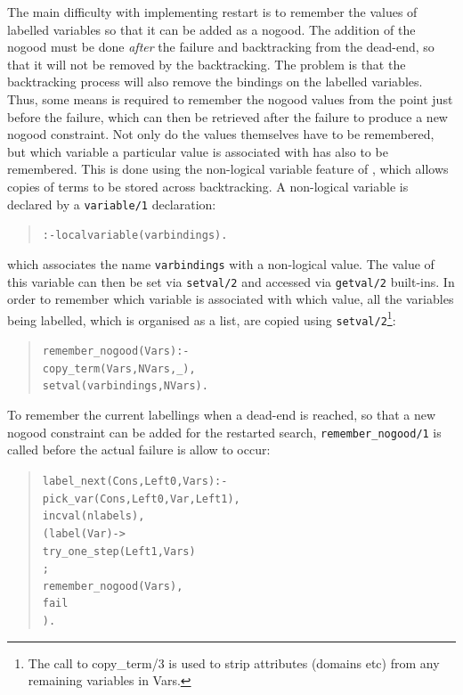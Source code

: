 The main difficulty with implementing restart is to remember the values of 
labelled variables so that it can be added as a nogood. The addition of the
nogood must be done {\it after\/} the failure and backtracking from the
dead-end, so that it will not be removed by the backtracking. The problem is
that the backtracking process will also remove the bindings on the labelled
variables. Thus, some means is required to remember the nogood values from
the point just before the failure, which can then be retrieved after the
failure to produce a new nogood constraint. Not only do the values
themselves have to be remembered, but which variable a particular value is
associated with has also to be remembered. This is done using the
non-logical variable feature of {\eclipse}, which allows copies of
terms to be stored across backtracking. A non-logical variable is
declared by a \verb'variable/1' declaration:

\begin{quote}\begin{alltt}
:- local variable(varbindings).
\end{alltt}\end{quote}

\noindent
which associates the name \verb'varbindings' with a non-logical value. The
value of this variable can then be set via \verb'setval/2' and accessed
via \verb'getval/2' built-ins. In order to remember
which variable is associated with which value,  all the variables being
labelled, which is organised as a list,
are copied using \verb'setval/2'\footnote{The call to copy\_term/3 is used
to strip attributes (domains etc) from any remaining variables in Vars.}:
\begin{quote}\begin{alltt}
remember_nogood(Vars) :-
        copy_term(Vars, NVars, _),
        setval(varbindings,NVars).
\end{alltt}\end{quote}

\noindent
To remember the current labellings when a dead-end is reached, so that a
new nogood constraint can be added for the restarted search,
\verb'remember_nogood/1' is called before the actual failure is allow to occur:

\begin{quote}\begin{alltt}
label_next(Cons, Left0, Vars) :-
        pick_var(Cons, Left0, Var, Left1), 
        incval(nlabels),
        ( label(Var) ->
            try_one_step(Left1, Vars)
        ;
            remember_nogood(Vars),
            fail
        ).
\end{alltt}\end{quote}


